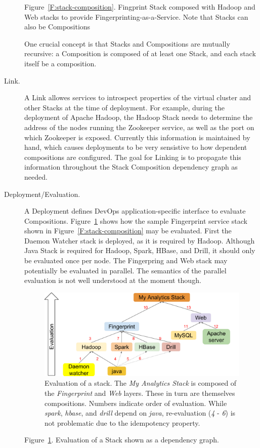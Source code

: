 \documentclass[9pt,twocolumn,twoside]{styles/osajnl}
\begin{document}
\begin{description}
  Figure~\ref{F:stack-composition}. Fingprint Stack composed with Hadoop and Web stacks to
  provide Fingerprinting-as-a-Service. Note that Stacks can also be
  Compositions


  One crucial concept is that Stacks and Compositions are mutually
  recursive: a Composition is composed of at least one Stack, and each
  stack itself be a composition.


\item[Link.] A Link allowes services to introspect properties of the
  virtual cluster and other Stacks at the time of deployment. For
  example, during the deployment of Apache Hadoop, the Hadoop Stack
  needs to determine the address of the nodes running the Zookeeper
  service, as well as the port on which Zookeeper is
  exposed. Currently this information is maintained by hand, which
  causes deployments to be very sensistive to how dependent
  compositions are configured. The goal for Linking is to propagate
  this information throughout the Stack Composition dependency graph
  as needed.


\item[Deployment/Evaluation.] A Deployment defines DevOps
  application-specific interface to evaluate Compositions.
  Figure~\ref{F:stack-graph} shows how the sample Fingerprint service
  stack shown in Figure~\ref{F:stack-composition} may be
  evaluated. First the Daemon Watcher stack is deployed, as it is
  required by Hadoop. Although Java Stack is required for Hadoop,
  Spark, HBase, and Drill, it should only be evaluated once per
  node. The Fingerpring and Web stack may potentially be evaluated in
  parallel. The semantics of the parallel evaluation is not well
  understood at the moment though.


  
  \begin{figure}
    \centering
    \includegraphics[width=1\columnwidth]{images/cloudmesh-stack-graph.pdf}
    \caption{Evaluation of a stack.
      The {\it My Analytics Stack} is composed of the {\it Fingerprint} and {\it Web} layers.
      These in turn are themselves compositions.
      Numbers indicate order of evaluation. While {\it spark}, {\it hbase}, and {\it drill} depend on {\it java}, re-evaluation (\textit{4} - \textit{6}) is not problematic due to the idempotency property.
      \label{F:stack-graph}}
  \end{figure}


  Figure~\ref{F:stack-graph}. Evaluation of a Stack shown as a dependency graph.


\end{description}
\end{document}
